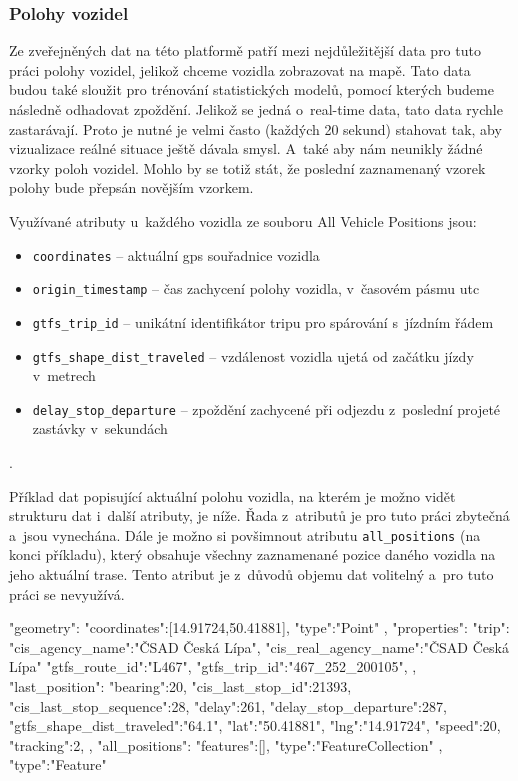 \subsubsection{Polohy vozidel}

Ze zveřejněných dat na této platformě patří mezi nejdůležitější data pro tuto práci polohy vozidel, jelikož chceme vozidla zobrazovat na mapě. Tato data budou také sloužit pro trénování statistických modelů, pomocí kterých budeme následně odhadovat zpoždění. Jelikož se jedná o~real-time data, tato data rychle zastarávají. Proto je nutné je velmi často (každých 20 sekund) stahovat tak, aby vizualizace reálné situace ještě dávala smysl. A~také aby nám neunikly žádné vzorky poloh vozidel. Mohlo by se totiž stát, že poslední zaznamenaný vzorek polohy bude přepsán novějším vzorkem.

\bigbreak

Využívané atributy u~každého vozidla ze souboru All Vehicle Positions jsou:

\begin{itemize}
	\item \verb-coordinates- -- aktuální \gls{gps} souřadnice vozidla

	\item \verb-origin_timestamp- -- čas zachycení polohy vozidla, v~časovém pásmu \gls{utc}

	\item \verb-gtfs_trip_id- -- unikátní identifikátor tripu pro spárování s~jízdním řádem

	\item \verb-gtfs_shape_dist_traveled- -- vzdálenost vozidla ujetá od začátku jízdy v~metrech

	\item \verb-delay_stop_departure- -- zpoždění zachycené při odjezdu z~poslední projeté zastávky v~sekundách
\end{itemize}.

Příklad dat popisující aktuální polohu vozidla, na kterém je možno vidět strukturu dat i~další atributy, je níže. Řada z~atributů je pro tuto práci zbytečná a~jsou vynechána. Dále je možno si povšimnout atributu \verb-all_positions- (na konci příkladu), který obsahuje všechny zaznamenané pozice daného vozidla na jeho aktuální trase. Tento atribut je z~důvodů objemu dat volitelný a~pro tuto práci se nevyužívá.

\begin{code}[frame=none]
"geometry":{
  "coordinates":[14.91724,50.41881],
  "type":"Point"
},
"properties":{
  "trip":{
    "cis_agency_name":"ČSAD Česká Lípa",
	"cis_real_agency_name":"ČSAD Česká Lípa"
	"gtfs_route_id":"L467",
	"gtfs_trip_id":"467_252_200105",
  },
  "last_position":{
    "bearing":20,
	"cis_last_stop_id":21393,
	"cis_last_stop_sequence":28,
	"delay":261,
	"delay_stop_departure":287,
	"gtfs_shape_dist_traveled":"64.1",
	"lat":"50.41881",
	"lng":"14.91724",
	"speed":20,
	"tracking":2,
	},
  "all_positions":{
    "features":[],
	"type":"FeatureCollection"
  }
},
"type":"Feature"

\end{code}

